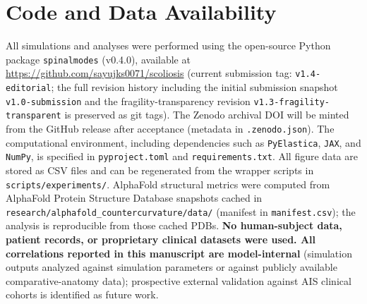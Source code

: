 \section*{Code and Data Availability}

All simulations and analyses were performed using the open-source Python package \texttt{spinalmodes} (v0.4.0), available at \url{https://github.com/sayujks0071/scoliosis} (current submission tag: \texttt{v1.4-editorial}; the full revision history including the initial submission snapshot \texttt{v1.0-submission} and the fragility-transparency revision \texttt{v1.3-fragility-transparent} is preserved as git tags). The Zenodo archival DOI will be minted from the GitHub release after acceptance (metadata in \texttt{.zenodo.json}). The computational environment, including dependencies such as \texttt{PyElastica}, \texttt{JAX}, and \texttt{NumPy}, is specified in \texttt{pyproject.toml} and \texttt{requirements.txt}. All figure data are stored as CSV files and can be regenerated from the wrapper scripts in \texttt{scripts/experiments/}. AlphaFold structural metrics were computed from AlphaFold Protein Structure Database snapshots cached in \texttt{research/alphafold\_countercurvature/data/} (manifest in \texttt{manifest.csv}); the analysis is reproducible from those cached PDBs. \textbf{No human-subject data, patient records, or proprietary clinical datasets were used. All correlations reported in this manuscript are model-internal} (simulation outputs analyzed against simulation parameters or against publicly available comparative-anatomy data); prospective external validation against AIS clinical cohorts is identified as future work.
